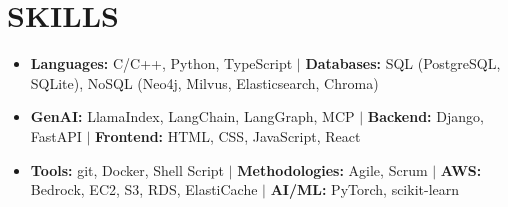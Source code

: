\documentclass[letterpaper,11pt]{article}
\newcommand{\resumeItem}[1]{
  \item\small{#1}
}
\newcommand{\resumeItemListStart}{\begin{itemize}[label=$\vcenter{\hbox{\tiny$\bullet$}}$]}
\newcommand{\resumeItemListEnd}{\end{itemize}}
\begin{document}
\section{SKILLS}
\resumeItemListStart
\resumeItem{\textbf{Languages:} C/C++, Python, TypeScript $|$ \textbf{Databases:} SQL (PostgreSQL, SQLite), NoSQL (Neo4j, Milvus, Elasticsearch, Chroma)}
\resumeItem{\textbf{GenAI:} LlamaIndex, LangChain, LangGraph, MCP $|$ \textbf{Backend:} Django, FastAPI   $|$ \textbf{Frontend:} HTML, CSS, JavaScript, React}
\resumeItem{\textbf{Tools:} git, Docker, Shell Script $|$ \textbf{Methodologies:} Agile, Scrum $|$  \textbf{AWS:} Bedrock, EC2, S3, RDS, ElastiCache $|$ \textbf{AI/ML:} PyTorch, scikit-learn}
\resumeItemListEnd
\vspace{-40pt}
\end{document}
